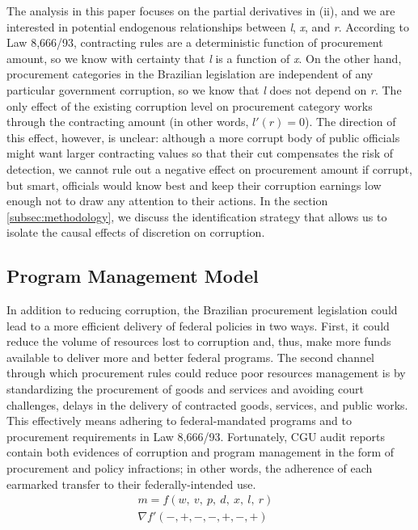 \documentclass[11pt]{article}
\begin{document}
The analysis in this paper focuses on the partial derivatives in (ii), and we are interested in potential endogenous relationships between \emph{l}, \emph{x}, and \emph{r}. According to Law 8,666/93, contracting rules are a deterministic function of procurement amount, so we know with certainty that \emph{l} is a function of \emph{x}. On the other hand, procurement categories in the Brazilian legislation are independent of any particular government corruption, so we know that \emph{l} does not depend on \emph{r}. The only effect of the existing corruption level on procurement category works through the contracting amount (in other words, $l'(r) = 0$). The direction of this effect, however, is unclear: although a more corrupt body of public officials might want larger contracting values so that their cut compensates the risk of detection, we cannot rule out a negative effect on procurement amount if corrupt, but smart, officials would know best and keep their corruption earnings low enough not to draw any attention to their actions. In the section \ref{subsec:methodology}, we discuss the identification strategy that allows us to isolate the causal effects of discretion on corruption.

\subsection{Program Management Model} \label{subsec:mismanagement}

In addition to reducing corruption, the Brazilian procurement legislation could lead to a more efficient delivery of federal policies in two ways. First, it could reduce the volume of resources lost to corruption and, thus, make more funds available to deliver more and better federal programs. The second channel through which procurement rules could reduce poor resources management is by standardizing the procurement of goods and services and avoiding court challenges, delays in the delivery of contracted goods, services, and public works. This effectively means adhering to federal-mandated programs and to procurement requirements in Law 8,666/93. Fortunately, CGU audit reports contain both evidences of corruption and program management in the form of procurement and policy infractions; in other words, the adherence of each earmarked transfer to their federally-intended use.
\begin{equation} \label{eq:alternativeoutcome}
  \begin{aligned}
    m = f(w,\ v,\ p,\ d,\ x,\ l,\ r)& \\
    \nabla f'(-,+,-,-,+,-,+)&
  \end{aligned}
\end{equation}
\end{document}
